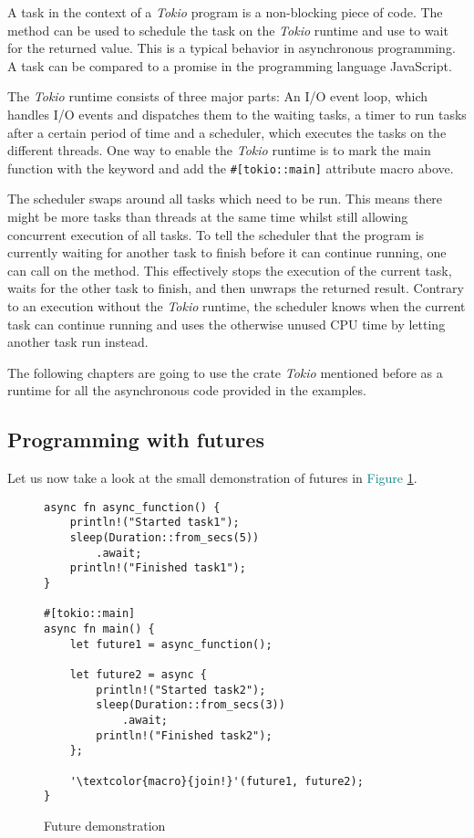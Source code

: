 A task in the context of a \textit{Tokio} program is a non-blocking piece of code. The  method
can be used to schedule the task on the \textit{Tokio} runtime and use  to wait for the returned value.
This is a typical behavior in asynchronous programming. A task can be compared to a promise in the programming language
JavaScript.

The \textit{Tokio} runtime consists of three major parts: An I/O event loop, which handles I/O events and dispatches
them to the waiting tasks, a timer to run tasks after a certain period of time and a scheduler, which executes the
tasks on the different threads. One way to enable the \textit{Tokio} runtime is to mark the main function with the
 keyword and add the \texttt{#[tokio::main]} attribute macro above.

The scheduler swaps around all tasks which need to be run. This means there might be more tasks than threads at the
same time whilst still allowing concurrent execution of all tasks. To tell the scheduler that the program is currently
waiting for another task to finish before it can continue running, one can call  on the method. This
effectively stops the execution of the current task, waits for the other task to finish, and then unwraps the returned
result. Contrary to an execution without the \textit{Tokio} runtime, the scheduler knows when the current task can
continue running and uses the otherwise unused CPU time by letting another task run instead.

The following chapters are going to use the crate \textit{Tokio} mentioned before as a runtime for all the asynchronous
code provided in the examples.

\subsection{Programming with futures}
Let us now take a look at the small demonstration of futures in \textcolor{teal}{Figure \ref{future}}.

\begin{figure}[ht]
    \begin{verbatim}
async fn async_function() {
    println!("Started task1");
    sleep(Duration::from_secs(5))
        .await;
    println!("Finished task1");
}

#[tokio::main]
async fn main() {
    let future1 = async_function();

    let future2 = async {
        println!("Started task2");
        sleep(Duration::from_secs(3))
            .await;
        println!("Finished task2");
    };

    '\textcolor{macro}{join!}'(future1, future2);
}
    \end{verbatim}
    \caption{Future demonstration}
    \label{future}
\end{figure}

